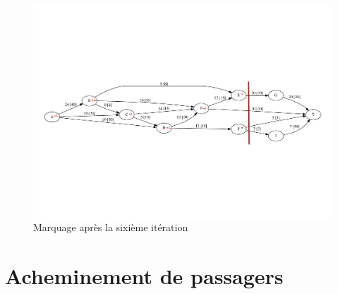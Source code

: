 \documentclass[paper=a4, fontsize=11pt]{scrartcl} %
\numberwithin{equation}{section} %
\numberwithin{figure}{section} %
\numberwithin{table}{section} %
\begin{document}
\begin{figure}[h]
\begin{center}
	\includegraphics[width=\textwidth]{figs/reseau-6m.pdf}
	\caption{Marquage après la sixième itération}
	\label{fig:res:6m}
\end{center}
\end{figure}


\clearpage

\section{Acheminement de passagers}


\end{document}
